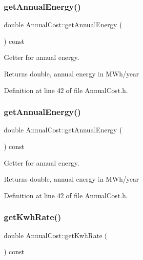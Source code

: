 \subsubsection{\texorpdfstring{get\+Annual\+Energy()}{getAnnualEnergy()}\hspace{0.1cm}{\footnotesize\ttfamily [2/3]}}
{\footnotesize\ttfamily double Annual\+Cost\+::get\+Annual\+Energy (\begin{DoxyParamCaption}{ }\end{DoxyParamCaption}) const\hspace{0.3cm}{\ttfamily [inline]}}

Getter for annual energy. \begin{DoxyReturn}{Returns}
double, annual energy in M\+Wh/year 
\end{DoxyReturn}


Definition at line 42 of file Annual\+Cost.\+h.

\mbox{\label{class_annual_cost_a0e217b7df05e6a03503e14d96570a192}} 
\subsubsection{\texorpdfstring{get\+Annual\+Energy()}{getAnnualEnergy()}\hspace{0.1cm}{\footnotesize\ttfamily [3/3]}}
{\footnotesize\ttfamily double Annual\+Cost\+::get\+Annual\+Energy (\begin{DoxyParamCaption}{ }\end{DoxyParamCaption}) const\hspace{0.3cm}{\ttfamily [inline]}}

Getter for annual energy. \begin{DoxyReturn}{Returns}
double, annual energy in M\+Wh/year 
\end{DoxyReturn}


Definition at line 42 of file Annual\+Cost.\+h.

\mbox{\label{class_annual_cost_ac01ed415360b6f52f61ec8a581333c29}} 
\subsubsection{\texorpdfstring{get\+Kwh\+Rate()}{getKwhRate()}\hspace{0.1cm}{\footnotesize\ttfamily [1/3]}}
{\footnotesize\ttfamily double Annual\+Cost\+::get\+Kwh\+Rate (\begin{DoxyParamCaption}{ }\end{DoxyParamCaption}) const\hspace{0.3cm}{\ttfamily [inline]}}

